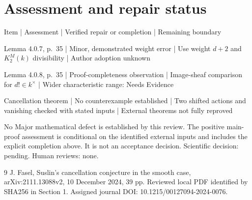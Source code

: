 \documentclass[10pt]{article}
\begin{document}
\section*{Assessment and repair status}
Item | Assessment | Verified repair or completion | Remaining boundary\par
Lemma 4.0.7, p. 35 | Minor, demonstrated weight error | Use weight \(d+2\) and \(K_2^M(k)\) divisibility | Author adoption unknown\par
Lemma 4.0.8, p. 35 | Proof-completeness observation | Image-sheaf comparison for \(d!\in k^\times\) | Wider characteristic range: Needs Evidence\par
Cancellation theorem | No counterexample established | Two shifted actions and vanishing checked with stated inputs | External theorems not fully reproved\par
No Major mathematical defect is established by this review. The positive main-proof assessment is conditional on the identified external inputs and includes the explicit completion above. It is not an acceptance decision. Scientific decision: pending. Human reviews: none.\par
9 J. Fasel, Suslin’s cancellation conjecture in the smooth case, arXiv:2111.13088v2, 10 December 2024, 39 pp. Reviewed local PDF identified by SHA256 in Section 1. Assigned journal DOI: 10.1215/00127094-2024-0076.\par
\end{document}
